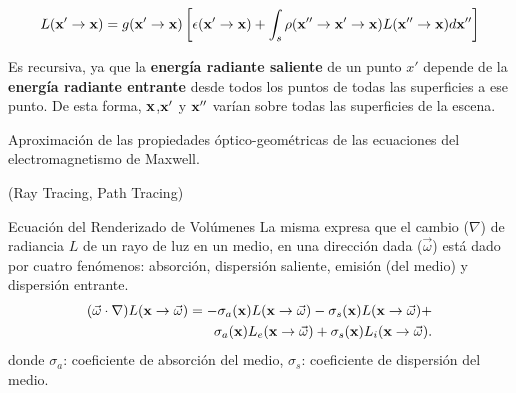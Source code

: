 \documentclass[spanish,unknownkeysallowed]{beamer}
\begin{document}
\begin{frame}

\begin{equation*}
L(\bold{x'} \rightarrow \bold{x}) =  g(\bold{x'}  \rightarrow \bold{x})  \left[ \epsilon(\bold{x'}  \rightarrow \bold{x}) + \int_{s}{\rho(\bold{x''}  \rightarrow \bold{x'}  \rightarrow \bold{x})L(\bold{x''}  \rightarrow \bold{x}) d\bold{x''}} \right]
\end{equation*}

Es recursiva, ya que la \textbf{energía radiante saliente} de un punto $x'$ depende de la \textbf{energía radiante entrante} desde todos los puntos de todas las superficies a ese punto.
De esta forma, $\bold{x}$,$\bold{x'}$ y $\bold{x''}$ varían sobre todas las superficies de la escena.

\vspace{0.2cm}
Aproximación de las propiedades óptico-geométricas de las ecuaciones del electromagnetismo de Maxwell.

(Ray Tracing, Path Tracing)
\end{frame}


\begin{frame}{Ecuación del Renderizado de Volúmenes}
La misma expresa que el cambio ($\nabla$) de radiancia $L$ de un rayo de luz en un medio, en una dirección dada ($\vec{\omega}$) está dado por cuatro fenómenos: absorción, dispersión saliente, emisión (del medio) y dispersión entrante.
\begin{equation*}
\begin{aligned}
(\vec{\omega} \cdot \nabla) L(\bold{x} \rightarrow \vec{\omega}) = - \sigma_{a}(\bold{x}) L(\bold{x} \rightarrow \vec{\omega}) - \sigma_{s}(\bold{x}) L(\bold{x} \rightarrow \vec{\omega}) + \\
\sigma_{a}(\bold{x}) L_{e}(\bold{x} \rightarrow \vec{\omega}) + \sigma_{s}(\bold{x}) L_{i}(\bold{x} \rightarrow \vec{\omega}).
\end{aligned}
\end{equation*}
donde $\sigma_{a}$: coeficiente de absorción del medio, $\sigma_{s}$: coeficiente de dispersión del medio.

\end{frame}
\end{document}
